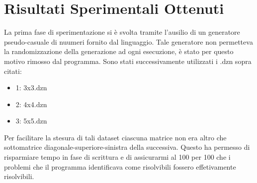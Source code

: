\documentclass{article}
\begin{document}
\section{Risultati Sperimentali Ottenuti}
La prima fase di sperimentazione si è svolta tramite l'ausilio di un generatore pseudo-casuale di nuumeri fornito dal linguaggio. Tale generatore non permetteva la randomizzazione della generazione ad ogni esecuzione, è stato per questo motivo rimosso dal programma. Sono stati successivamente utilizzati i .dzn sopra citati:
\begin{itemize}
\item 1: 3x3.dzn
\item 2: 4x4.dzn
\item 3: 5x5.dzn
\end{itemize}
Per facilitare la stesura di tali dataset ciascuna matrice non era altro che sottomatrice diagonale-superiore-sinistra della successiva. Questo ha permesso di risparmiare tempo in fase di scrittura e di assicurarmi al 100 per 100 che i problemi che il programma identificava come risolvibili fossero effetivamente risolvibili.
\end{document}

